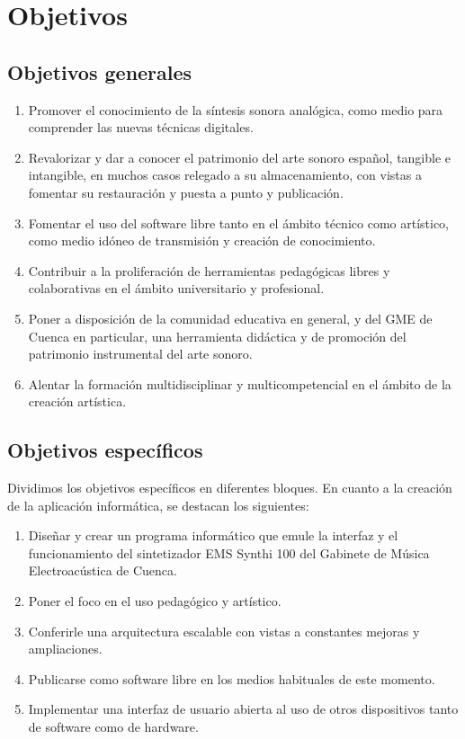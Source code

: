 \chapter{Objetivos}
\section{Objetivos generales}


\begin{enumerate}
	\item Promover el conocimiento de la síntesis sonora analógica, como medio para comprender las nuevas técnicas digitales.
	\item Revalorizar y dar a conocer el patrimonio del arte sonoro español, tangible e intangible, en muchos casos relegado a su almacenamiento, con vistas a fomentar su restauración y puesta a punto y publicación.
	\item Fomentar el uso del software libre tanto en el ámbito técnico como artístico, como medio idóneo de transmisión y creación de conocimiento.
	\item Contribuir a la proliferación de herramientas pedagógicas libres y colaborativas en el ámbito universitario y profesional.
	\item Poner a disposición de la comunidad educativa en general, y del GME de Cuenca en particular, una herramienta didáctica y de promoción del patrimonio instrumental del arte sonoro.
	\item Alentar la formación multidisciplinar y multicompetencial en el ámbito de la creación artística.
\end{enumerate}





\section{Objetivos específicos}

Dividimos los objetivos específicos en diferentes bloques. En cuanto a la creación de la aplicación informática, se destacan los siguientes:

\begin{enumerate}
	
	\item Diseñar y crear un programa informático que emule la interfaz y el funcionamiento del sintetizador EMS Synthi 100 del Gabinete de Música Electroacústica de Cuenca.
	\item Poner el foco en el uso pedagógico y artístico.
	\item Conferirle una arquitectura escalable con vistas a constantes mejoras y ampliaciones.
	\item Publicarse como software libre en los medios habituales de este momento.
	\item Implementar una interfaz de usuario abierta al uso de otros dispositivos tanto de software como de hardware.

\end{enumerate}

